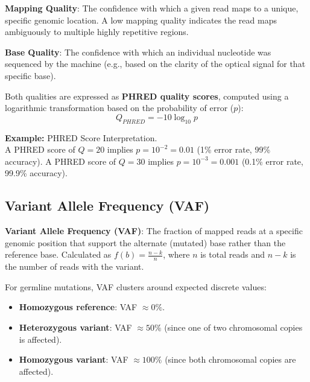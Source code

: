 \begin{important}
  \textbf{Mapping Quality}: The confidence with which a given read maps to a unique, specific genomic location. A low mapping quality indicates the read maps ambiguously to multiple highly repetitive regions.
\end{important}

\begin{important}
  \textbf{Base Quality}: The confidence with which an individual nucleotide was sequenced by the machine (e.g., based on the clarity of the optical signal for that specific base).
\end{important}

Both qualities are expressed as \textbf{PHRED quality scores}, computed using a logarithmic transformation based on the probability of error (\( p \)):
\begin{equation}
    Q_{PHRED} = -10 \log_{10} p
\end{equation}

\sta \textbf{Example:} PHRED Score Interpretation. \\
A PHRED score of $Q=20$ implies $p = 10^{-2} = 0.01$ (1\% error rate, 99\% accuracy). A PHRED score of $Q=30$ implies $p = 10^{-3} = 0.001$ (0.1\% error rate, 99.9\% accuracy).

\subsection{Variant Allele Frequency (VAF)}

\begin{important}
  \textbf{Variant Allele Frequency (VAF)}: The fraction of mapped reads at a specific genomic position that support the alternate (mutated) base rather than the reference base. Calculated as $f(b) = \frac{n-k}{n}$, where $n$ is total reads and $n-k$ is the number of reads with the variant.
\end{important}

For germline mutations, VAF clusters around expected discrete values:
\begin{itemize}
    \item \textbf{Homozygous reference}: VAF $\approx 0\%$.
    \item \textbf{Heterozygous variant}: VAF $\approx 50\%$ (since one of two chromosomal copies is affected).
    \item \textbf{Homozygous variant}: VAF $\approx 100\%$ (since both chromosomal copies are affected).
\end{itemize}

